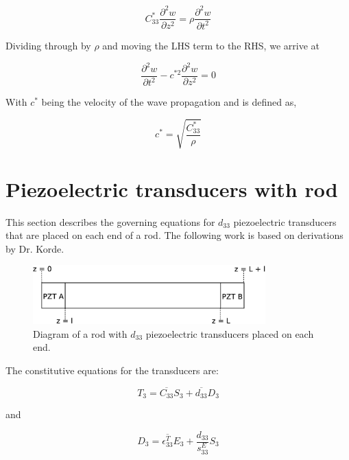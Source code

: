 \begin{equation}
C^*_{33}\frac{\partial ^2w}{\partial z^2} = \rho \frac{\partial ^2w}{\partial t^2}
\end{equation}

Dividing through by $\rho$ and moving the LHS term to the RHS, we arrive at

\begin{equation}
\frac{\partial ^2w}{\partial t^2} - c^{*2} \frac{\partial ^2w}{\partial z^2} = 0
\label{eq:waveEquationFin}
\end{equation}


With $c^*$ being the velocity of the wave propagation and is defined as,

\begin{equation}
c^* = \sqrt{\frac{C^*_{33}}{\rho}}
\end{equation}

\section{Piezoelectric transducers with rod}

This section describes the governing equations for $d_{33}$ piezoelectric transducers that are placed on each end of a rod. The following work is based on derivations by Dr. Korde.

\begin{figure}[ht!]
\centering
\includegraphics[width=0.8\textwidth]{eps_pics/rodTrans.eps}
\caption{Diagram of a rod with $d_{33}$ piezoelectric transducers placed on each end.
	 \label{fig:rodTrans}} 
\end{figure}

The constitutive equations for the transducers are:

\begin{equation}
T_3 = \overline{C_{33}} S_3 + \overline{d_{33}} D_3
\end{equation}

and 

\begin{equation}
D_3 = \overline{\epsilon ^T_{33}} E_3 + \frac{d_{33}}{s^E_{33}} S_3
\end{equation}

